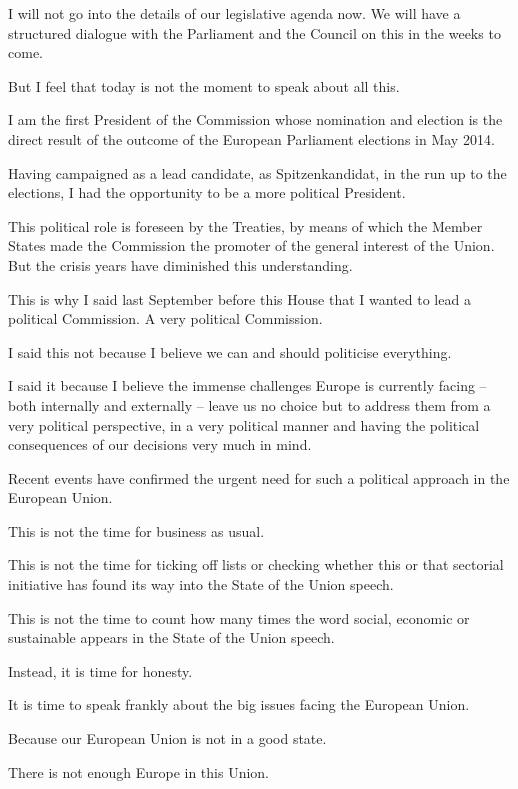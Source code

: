 \documentclass[a4paper,11pt]{article}
\begin{document}
I will not go into the details of our legislative agenda now. We will have a structured dialogue with the Parliament and the Council on this in the weeks to come.

But I feel that today is not the moment to speak about all this.

I am the first President of the Commission whose nomination and election is the direct result of the outcome of the European Parliament elections in May 2014.

Having campaigned as a lead candidate, as Spitzenkandidat, in the run up to the elections, I had the opportunity to be a more political President.

This political role is foreseen by the Treaties, by means of which the Member States made the Commission the promoter of the general interest of the Union. But the crisis years have diminished this understanding.

This is why I said last September before this House that I wanted to lead a political Commission. A very political Commission.

I said this not because I believe we can and should politicise everything.

I said it because I believe the immense challenges Europe is currently facing – both internally and externally – leave us no choice but to address them from a very political perspective, in a very political manner and having the political consequences of our decisions very much in mind.

Recent events have confirmed the urgent need for such a political approach in the European Union.

This is not the time for business as usual.

This is not the time for ticking off lists or checking whether this or that sectorial initiative has found its way into the State of the Union speech.

This is not the time to count how many times the word social, economic or sustainable appears in the State of the Union speech.

Instead, it is time for honesty.

It is time to speak frankly about the big issues facing the European Union.

 

Because our European Union is not in a good state.

 

There is not enough Europe in this Union.
\end{document}
